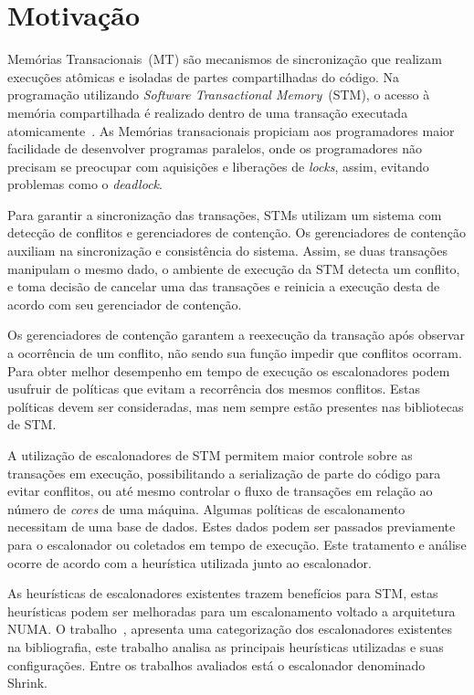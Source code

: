 \documentclass[diss-proposta,nocipinfo]{texufpel}
\begin{document}
\chapter{Motivação}

Memórias Transacionais~(MT) são mecanismos de sincronização que realizam execuções atômicas e isoladas de partes compartilhadas do código. Na programação utilizando \emph{Software Transactional Memory}~(STM), o acesso à memória compartilhada é realizado dentro de uma transação executada atomicamente~\cite{teixeira15}. As Memórias transacionais propiciam aos programadores maior facilidade de desenvolver programas paralelos, onde os programadores não precisam se preocupar com aquisições e liberações de \emph{locks}, assim, evitando problemas como o \emph{deadlock}.

Para garantir a sincronização das transações, STMs utilizam um sistema com detecção de conflitos e gerenciadores de contenção. Os gerenciadores de contenção auxiliam na sincronização e consistência do sistema. Assim, se duas transações manipulam o mesmo dado, o ambiente de execução da STM detecta um conflito, e toma decisão de cancelar uma das transações e reinicia a execução desta de acordo com seu gerenciador de contenção.

Os gerenciadores de contenção garantem a reexecução da transação após observar a ocorrência de um conflito, não sendo sua função impedir que conflitos ocorram. Para obter melhor desempenho em tempo de execução os escalonadores podem usufruir de políticas que evitam a recorrência dos mesmos conflitos. Estas políticas devem ser consideradas, mas nem sempre estão presentes nas bibliotecas de STM.

A utilização de escalonadores de STM permitem maior controle sobre as transações em execução, possibilitando a serialização de parte do código para evitar conflitos, ou até mesmo controlar o fluxo de transações em relação ao número de \emph{cores} de uma máquina. Algumas políticas de escalonamento necessitam de uma base de dados. Estes dados podem ser passados previamente para o escalonador ou coletados em tempo de execução. Este tratamento e análise ocorre de acordo com a heurística utilizada junto ao escalonador.

As heurísticas de escalonadores existentes trazem benefícios para STM, estas heurísticas podem ser melhoradas para um escalonamento voltado a arquitetura NUMA. O trabalho~\cite{sanzo17}, apresenta uma categorização dos escalonadores existentes na bibliografia, este trabalho analisa as principais heurísticas utilizadas e suas configurações. Entre os trabalhos avaliados está o escalonador denominado Shrink.
\end{document}
